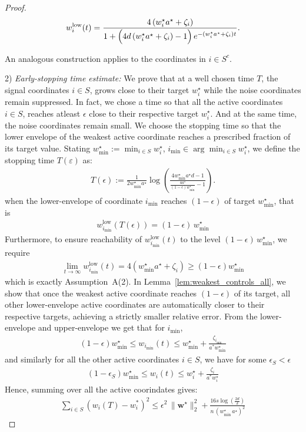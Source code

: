 \documentclass{article}
\theoremstyle{plain}
\theoremstyle{definition}
\theoremstyle{remark}
\begin{document}
{\begin{proof}
\begin{align}
w_i^{\mathrm{low}}(t)
=
\frac{4\,(w_i^\star a^\star+\zeta_i)}%
{1+\Bigl(4d\,(w_i^\star a^\star+\zeta_i)-1\Bigr)\,e^{-(w_i^\star a^\star+\zeta_i)t}}.
\end{align}

 An analogous construction applies to the coordinates in $i \in S^{c} $. 

2) \textit{ Early-stopping time estimate:}
We prove that at a well chosen time $T$, the signal coordinates $i \in S$, grows close to their target $w^{\star}_{i}$ while the noise coordinates remain suppressed. In fact, we chose a time so that all the active coordinates $i\in S$, reaches atleast $\epsilon$ close to their respective target $w^\star_{i}$. And at the same time, the noise coordinates remain small. We choose the stopping time so that the lower envelope of the weakest active coordinate reaches a prescribed fraction of its target value. Stating
$w^\star_{\min} := \min_{i\in S} w_i^\star$,  $i_{\min} \in \arg\min_{i\in S} w_i^\star$, we define the stopping time $T(\varepsilon)$ as:
\begin{align}
    T(\epsilon)
:=
\frac{1}{2 w^\star_{\min} a^\star}
\log\!\left(
\frac{4 w^\star_{\min} a^\star d - 1}
{\frac{4 a^\star}{(1-\epsilon) w^\star_{\min}} - 1}
\right).
\end{align}
when the lower-envelope of coordinate $i_{\min}$ reaches $(1-\epsilon)$ of target $w^\star_{\min}$, that is 
\begin{align*}
    w^{\mathrm{low}}_{i_{\min}}(T(\epsilon)) = (1-\epsilon)\, w^\star_{\min}
\end{align*}
Furthermore, to ensure reachability of $w^{\mathrm{low}}_{i_{\min}}(t)$ to the level $(1-\epsilon)\, w^\star_{\min}$, we require
\begin{align}
    \lim_{t\rightarrow\infty} w^{\mathrm{low}}_{i_{\min}}(t) = 4( w^\star_{\min} a^\star + \zeta_{i}) \geq (1-\epsilon)w^\star_{\min}
\end{align}
which is exactly Assumption~A(2). 
In Lemma~\ref{lem:weakest_controls_all}, we show that once the weakest active coordinate reaches 
$(1-\epsilon)$ of its target, all other lower-envelope active coordinates are automatically closer to their respective targets, achieving a strictly smaller relative error.
From the lower-envelope and upper-envelope we get that for $i_{\min}$, 
\begin{align}
    (1-\epsilon)w^\star_{\min} \leq w_{i_{\min}}(t) \leq  w^\star_{\min} + \frac{\zeta_{i_{\min}}}{a^{*}w^\star_{\min}}
\end{align}
and similarly for all the other active coordinates $i \in S$, we have for some $\epsilon_{S}<\epsilon$
\begin{align}
    (1-\epsilon_{S})w^\star_{\min} \leq w_{i}(t) \leq  w_{i}^\star + \frac{\zeta_{i}}{a^{*}w_{i}^\star}
\end{align}
Hence, summing over all the active coorindates gives:
\begin{align}
\label{active-sum-restate}
    \sum_{i\in S}(w_i(T)-w_i^*)^2 \leq \epsilon^2\,\|\mathbf w^\star\|_2^2 + \frac{16s\log (\frac{2d}{\delta})}{n\, (w_{\min}^\star\, a^\star)^2}
\end{align}


\end{proof}}
\end{document}

